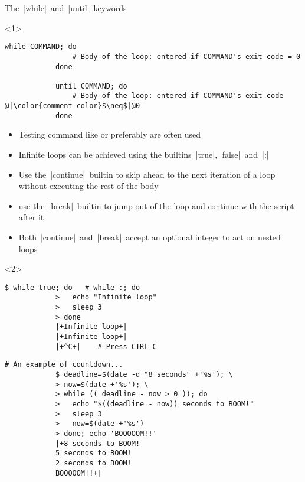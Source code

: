 \begin{frame}[fragile]{The \,\bash|while|\, and \,\bash|until|\, keywords}
    \begin{onlyenv}<1>
        \begin{lstlisting}[style=MyBash, numbers=none]
            while COMMAND; do
                # Body of the loop: entered if COMMAND's exit code = 0
            done
            
            until COMMAND; do
                # Body of the loop: entered if COMMAND's exit code @|\color{comment-color}$\neq$|@0
            done
        \end{lstlisting}
        \bigskip
        \begin{itemize}
            \item Testing command like \bash{[} or preferably \bash{[[} are often used
            \item Infinite loops can be achieved using the builtins \,\bash|true|, \bash|false|\, and \,\bash|:|
            \item Use the \,\bash|continue|\, builtin to skip ahead to the next iteration of a loop without executing the rest of the body
            \item use the \,\bash|break|\, builtin to jump out of the loop and continue with the script after it
            \item Both \,\bash|continue|\, and \,\bash|break|\, accept an optional integer to act on nested loops
        \end{itemize}
    \end{onlyenv}
    \begin{onlyenv}<2>
        \begin{lstlisting}[style=MyBash]
            $ while true; do   # while :; do
            >   echo "Infinite loop"
            >   sleep 3
            > done
            |+Infinite loop+|
            |+Infinite loop+|
            |+^C+|    # Press CTRL-C
        \end{lstlisting}
        \medskip
        \begin{lstlisting}[style=MyBash]
            # An example of countdown...
            $ deadline=$(date -d "8 seconds" +'%s'); \
            > now=$(date +'%s'); \
            > while (( deadline - now > 0 )); do
            >   echo "$((deadline - now)) seconds to BOOM!"
            >   sleep 3
            >   now=$(date +'%s')
            > done; echo 'BOOOOOM!!'
            |+8 seconds to BOOM!
            5 seconds to BOOM!
            2 seconds to BOOM!
            BOOOOOM!!+|
        \end{lstlisting}
    \end{onlyenv}
\end{frame}
